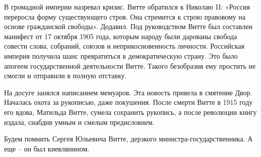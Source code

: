 В громадной империи назревал кризис. Витте обратился к Николаю II: «Россия
переросла форму существующего строя. Она стремится к строю правовому на основе
гражданской свободы». Додавил. Под руководством Витте был составлен манифест от
17 октября 1905 года, которым народу были дарованы свобода совести слова,
собраний, союзов и неприкосновенность личности. Российская империя получила
шанс превратиться в демократическую страну. Это было апогеем государственной
деятельности Витте. Такого безобразия ему простить не смогли и отправили в
полную отставку. 

На досуге занялся написанием мемуаров. Эта новость привела в смятение Двор.
Началась охота за рукописью, даже покушения. После смерти Витте в 1915 году его
вдова, Матильда Витте, сумела сохранить рукопись, а после революции книгу
издала, снабдив умным и смелым предисловием. 

Будем помнить Сергея Юльевича Витте, дерзкого министра-государственника. А еще
– он был киевлянином.

